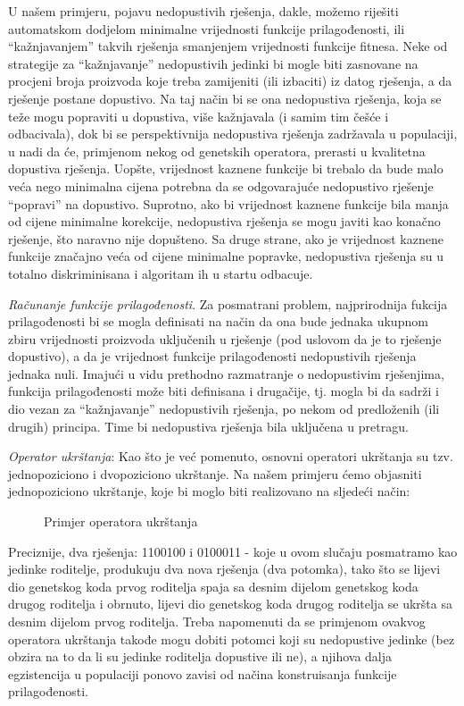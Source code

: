 \documentclass[a4paper, utf8, 11pt, colorlinks]{book}
\begin{document}
U našem primjeru, pojavu nedopustivih rješenja, dakle, možemo riješiti automatskom dodjelom minimalne vrijednosti funkcije prilagođenosti, ili ``kažnjavanjem'' takvih rješenja smanjenjem vrijednosti funkcije fitnesa. Neke od strategije za ``kažnjavanje'' nedopustivih jedinki bi mogle biti zasnovane na procjeni broja proizvoda koje treba zamijeniti (ili izbaciti) iz datog rješenja, a da rješenje postane dopustivo. Na taj način bi se ona nedopustiva rješenja, koja se teže mogu popraviti u dopustiva, više kažnjavala (i samim tim češće i odbacivala), dok bi se perspektivnija nedopustiva rješenja zadržavala u populaciji, u nadi da će, primjenom nekog od genetskih operatora, prerasti u kvalitetna dopustiva rješenja. Uopšte, vrijednost kaznene funkcije bi trebalo da bude malo veća nego minimalna cijena potrebna da se odgovarajuće nedopustivo rješenje ``popravi'' na dopustivo. Suprotno, ako bi vrijednost kaznene funkcije bila manja od cijene minimalne korekcije, nedopustiva rješenja se mogu javiti kao konačno rješenje, što naravno nije dopušteno. Sa druge strane, ako je vrijednost kaznene funkcije značajno veća od cijene minimalne popravke, nedopustiva rješenja su u totalno diskriminisana i algoritam ih u startu odbacuje. 

\emph{Računanje funkcije prilagođenosti}. Za posmatrani problem, najprirodnija fukcija prilagođenosti bi se mogla definisati na način da ona bude jednaka ukupnom zbiru vrijednosti proizvoda uključenih u rješenje (pod uslovom da je to rješenje dopustivo), a da je vrijednost funkcije prilagođenosti  nedopustivih rješenja   jednaka nuli. 
Imajući u vidu prethodno razmatranje o nedopustivim rješenjima, funkcija prilagođenosti može biti definisana i drugačije, tj. mogla bi da sadrži i dio vezan za  ``kažnjavanje'' nedopustivih rješenja, po nekom od predloženih (ili drugih) principa. Time bi nedopustiva rješenja bila uključena u pretragu.

\emph{Operator ukrštanja}: Kao što je već pomenuto, osnovni operatori ukrštanja su tzv. jednopoziciono i dvopoziciono ukrštanje. Na našem primjeru ćemo objasniti  jednopoziciono ukrštanje, koje bi moglo biti realizovano na sljedeći način:
\begin{figure}
	\caption{Primjer operatora ukrštanja}
\end{figure}

Preciznije, dva rješenja: 1100100 i 0100011 - koje u ovom slučaju posmatramo kao jedinke roditelje, produkuju dva nova rješenja (dva potomka), tako što se lijevi dio genetskog koda prvog roditelja spaja sa desnim dijelom genetskog koda drugog roditelja i obrnuto, lijevi dio genetskog koda drugog roditelja se ukršta sa desnim dijelom prvog roditelja. 
Treba napomenuti da se primjenom ovakvog operatora ukrštanja takođe mogu dobiti potomci koji su nedopustive jedinke (bez obzira na to da li su jedinke roditelja dopustive ili ne), a njihova dalja egzistencija u populaciji ponovo zavisi od načina konstruisanja funkcije prilagođenosti.
\end{document}
